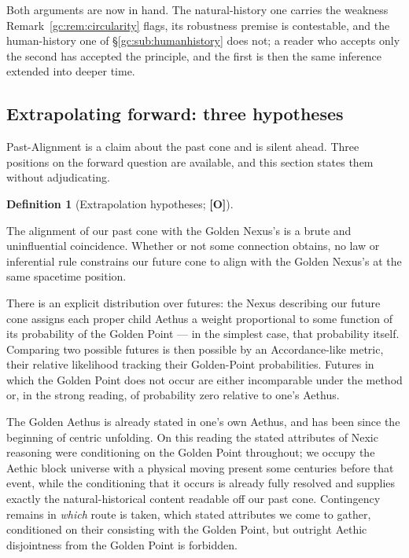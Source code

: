 \documentclass[11pt]{article}
\numberwithin{equation}{section}
\theoremstyle{plain}
\theoremstyle{definition}
\newtheorem{definition}[theorem]{Definition}
\theoremstyle{remark}
\begin{document}
Both arguments are now in hand. The natural-history one carries the
weakness Remark~\ref{gc:rem:circularity} flags, its robustness
premise is contestable, and the human-history one of
\S\ref{gc:sub:humanhistory} does not; a reader who accepts only the
second has accepted the principle, and the first is then the same
inference extended into deeper time.

\subsection{Extrapolating forward: three hypotheses}
\label{gc:sub:extrapolation}

Past-Alignment is a claim about the past cone and is silent ahead. Three
positions on the forward question are available, and this section states
them without adjudicating.

\begin{definition}[Extrapolation hypotheses; \textbf{[O]}]
\label{gc:def:extrapolation}
\begin{description}\itemsep3pt
\item[Void.] The alignment of our past cone with the Golden Nexus's is
a brute and uninfluential coincidence. Whether or not some connection
obtains, no law or inferential rule constrains our future cone to align
with the Golden Nexus's at the same spacetime position.

\item[Weak.] There is an explicit distribution over futures: the Nexus
describing our future cone assigns each proper child Aethus a weight
proportional to some function of its probability of the Golden Point ---
in the simplest case, that probability itself. Comparing two possible
futures is then possible by an Accordance-like metric, their relative
likelihood tracking their Golden-Point probabilities. Futures in which
the Golden Point does not occur are either incomparable under the
method or, in the strong reading, of probability zero relative to one's
Aethus.

\item[Strong.] The Golden Aethus is already stated in one's own Aethus,
and has been since the beginning of centric unfolding. On this reading
the stated attributes of Nexic reasoning were conditioning on the Golden
Point throughout; we occupy the Aethic block universe with a physical
moving present some centuries before that event, while the conditioning
that it occurs is already fully resolved and supplies exactly the
natural-historical content readable off our past cone. Contingency
remains in \emph{which} route is taken, which stated attributes we
come to gather, conditioned on their consisting with the Golden Point, but outright Aethic disjointness from the Golden Point is
forbidden.
\end{description}
\end{definition}
\end{document}
